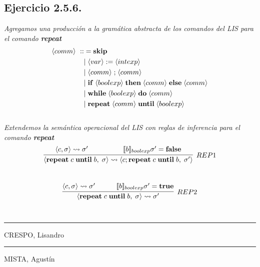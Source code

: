 \documentclass[a4paper,10pt]{article}
\begin{document}
\subsection*{Ejercicio 2.5.6.}
	\emph{Agregamos una producción a la gramática abstracta de los comandos del LIS para el comando {\bf repeat}}
	\\
	\begin{alignat*}{3}
		\langle comm \rangle\ ::&= {\bf skip} \\
			&|\;\langle var  \rangle  \;{:=}\;\langle intexp \rangle\\
			&|\;\langle comm \rangle  \;{;}\;\langle comm \rangle\\
			&|\;{\bf if}\;\langle boolexp \rangle\;{\bf then}\;\langle comm \rangle\;{\bf else}\;\langle comm \rangle\\
			&|\;{\bf while}\;\langle boolexp \rangle\;{\bf do}\;\langle comm \rangle\\
			&|\;{\bf repeat}\;\langle comm \rangle\;{\bf until}\;\langle boolexp \rangle
	\end{alignat*}
\pagebreak
	\\
	\emph{Extendemos la semántica operacional del LIS con reglas de inferencia para el comando {\bf repeat}}
	\\
	\begin{align*}
		\infer[REP1]{
			\langle {\bf repeat}\; c\;{\bf until}\; b,\;\sigma\rangle \rightsquigarrow \langle c; {\bf repeat}\; c\;{\bf until}\; b,\;\sigma'\rangle
		}{
			\langle c, \sigma\rangle \rightsquigarrow \sigma'
			\qquad & \qquad 
			[\![b]\!]_{boolexp}\sigma' = {\bf false} 
		}
	\end{align*}
	\\
	\begin{align*}
		\infer[REP2]{
			\langle {\bf repeat}\; c\;{\bf until}\; b,\;\sigma\rangle \rightsquigarrow \sigma'
		}{
			\langle c, \sigma\rangle \rightsquigarrow \sigma'
			\quad & \quad  
			[\![b]\!]_{boolexp}\sigma' = {\bf true} 
		}
	\end{align*}
\\
\vspace{\fill}
\begin{multicols}{2}
	\hrule
	\vspace{5pt}
	CRESPO, Lisandro \\
	\linebreak

	\hrule
	\vspace{5pt}
	MISTA, Agustín \\
\end{multicols}
\end{document}
